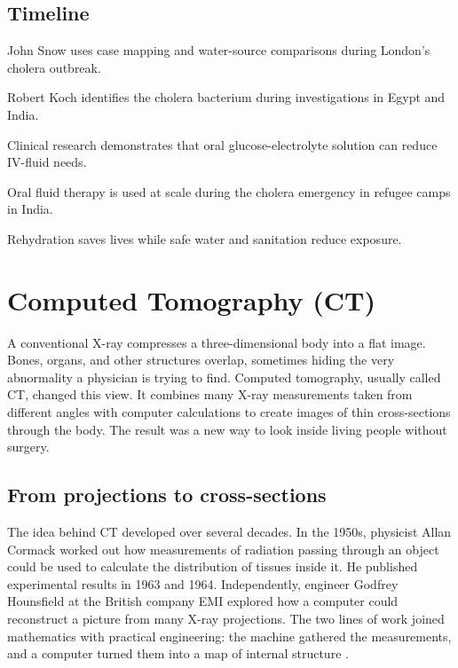 \documentclass[12pt,oneside]{book}
\begin{document}
\section*{Timeline}
\begin{description}[leftmargin=2.3cm,style=nextline]
  \item[1854] John Snow uses case mapping and water-source comparisons during London's cholera outbreak.
  \item[1883] Robert Koch identifies the cholera bacterium during investigations in Egypt and India.
  \item[1968] Clinical research demonstrates that oral glucose-electrolyte solution can reduce IV-fluid needs.
  \item[1971] Oral fluid therapy is used at scale during the cholera emergency in refugee camps in India.
  \item[Today] Rehydration saves lives while safe water and sanitation reduce exposure.
\end{description}
\chapter[Computed Tomography (CT)]{Computed Tomography (CT)}

A conventional X-ray compresses a three-dimensional body into a flat image.
Bones, organs, and other structures overlap, sometimes hiding the very
abnormality a physician is trying to find. Computed tomography, usually
called CT, changed this view. It combines many X-ray measurements taken
from different angles with computer calculations to create images of thin
cross-sections through the body. The result was a new way to look inside
living people without surgery.

\section{From projections to cross-sections}
The idea behind CT developed over several decades. In the 1950s, physicist
Allan Cormack worked out how measurements of radiation passing through an
object could be used to calculate the distribution of tissues inside it.
He published experimental results in 1963 and 1964. Independently, engineer
Godfrey Hounsfield at the British company EMI explored how a computer could
reconstruct a picture from many X-ray projections. The two lines of work
joined mathematics with practical engineering: the machine gathered the
measurements, and a computer turned them into a map of internal structure
\cite{ctMilestones}.
\end{document}
